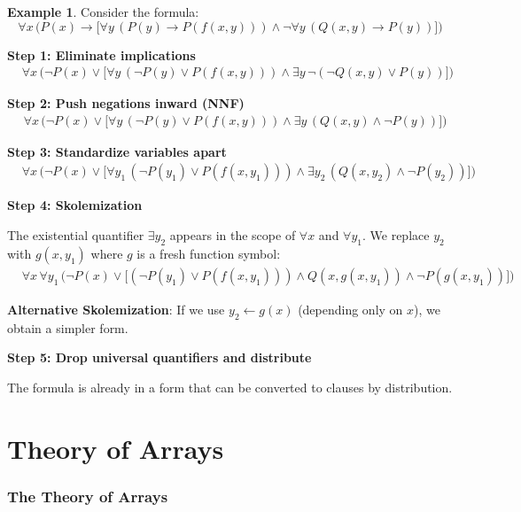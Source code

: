 \documentclass[11pt,a4paper]{article}
\theoremstyle{definition}
\newtheorem{example}{Example}[section]
\theoremstyle{plain}
\theoremstyle{remark}
\begin{document}
\begin{example}
Consider the formula:
\[
\forall x \, \bigl(P(x) \rightarrow \bigl[\forall y \, (P(y) \rightarrow P(f(x, y))) \wedge \neg \forall y \, (Q(x, y) \rightarrow P(y))\bigr]\bigr)
\]

\textbf{Step 1: Eliminate implications}
\begin{align*}
&\forall x \, \bigl(\neg P(x) \vee \bigl[\forall y \, (\neg P(y) \vee P(f(x, y))) \wedge \exists y \, \neg (\neg Q(x, y) \vee P(y))\bigr]\bigr)
\end{align*}

\textbf{Step 2: Push negations inward (NNF)}
\begin{align*}
&\forall x \, \bigl(\neg P(x) \vee \bigl[\forall y \, (\neg P(y) \vee P(f(x, y))) \wedge \exists y \, (Q(x, y) \wedge \neg P(y))\bigr]\bigr)
\end{align*}

\textbf{Step 3: Standardize variables apart}
\begin{align*}
&\forall x \, \bigl(\neg P(x) \vee \bigl[\forall y_1 \, (\neg P(y_1) \vee P(f(x, y_1))) \wedge \exists y_2 \, (Q(x, y_2) \wedge \neg P(y_2))\bigr]\bigr)
\end{align*}

\textbf{Step 4: Skolemization}

The existential quantifier $\exists y_2$ appears in the scope of $\forall x$ and $\forall y_1$. We replace $y_2$ with $g(x, y_1)$ where $g$ is a fresh function symbol:
\begin{align*}
&\forall x \, \forall y_1 \, \bigl(\neg P(x) \vee \bigl[(\neg P(y_1) \vee P(f(x, y_1))) \wedge Q(x, g(x, y_1)) \wedge \neg P(g(x, y_1))\bigr]\bigr)
\end{align*}

\textbf{Alternative Skolemization}: If we use $y_2 \leftarrow g(x)$ (depending only on $x$), we obtain a simpler form.

\textbf{Step 5: Drop universal quantifiers and distribute}

The formula is already in a form that can be converted to clauses by distribution.
\end{example}



\newpage 

\part{Theory of Arrays}

\section{The Theory of Arrays}
\end{document}
